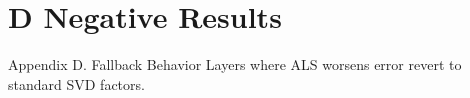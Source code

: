 \section{D Negative Results}

 Appendix D. Fallback Behavior
Layers where ALS worsens error revert to standard SVD factors.
